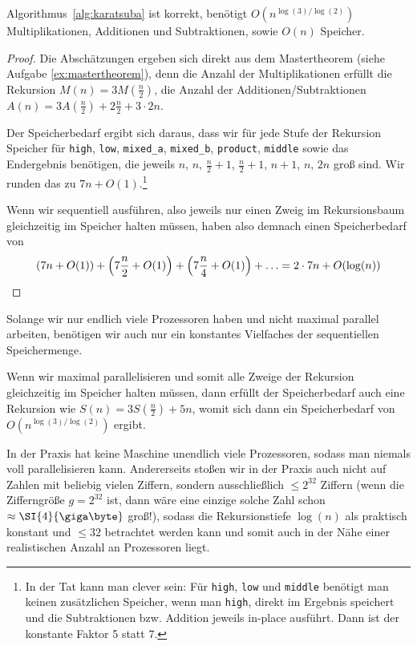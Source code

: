 \begin{proposition}
    Algorithmus~\ref{alg:karatsuba} ist korrekt, benötigt $O(n^{\log(3) / \log(2)})$ Multiplikationen, Additionen und Subtraktionen, sowie $O(n)$ Speicher.
\end{proposition}
\begin{proof}
    Die Abschätzungen ergeben sich direkt aus dem Mastertheorem (siehe Aufgabe \ref{ex:mastertheorem}), denn die Anzahl der Multiplikationen erfüllt die Rekursion $M(n) = 3 M(\frac{n}{2})$, die Anzahl der Additionen/Subtraktionen $A(n) = 3 A(\frac{n}{2})+2\frac{n}{2} + 3\cdot 2n$.

    \medskip
    Der Speicherbedarf ergibt sich daraus, dass wir für jede Stufe der Rekursion Speicher für \texttt{high}, \texttt{low}, \texttt{mixed\_a}, \texttt{mixed\_b}, \texttt{product},  \texttt{middle} sowie das Endergebnis benötigen, die jeweils $n$, $n$, $\frac{n}{2}+1$, $\frac{n}{2}+1$, $n+1$, $n$, $2n$ groß sind. Wir runden das zu $7n+O(1)$.\footnote{In der Tat kann man clever sein: Für \texttt{high}, \texttt{low} und \texttt{middle} benötigt man keinen zusätzlichen Speicher, wenn man \texttt{high},  direkt im Ergebnis speichert und die Subtraktionen bzw. Addition jeweils in-place ausführt. Dann ist der konstante Faktor 5 statt 7.}

    \smallskip
    Wenn wir sequentiell ausführen, also jeweils nur einen Zweig im Rekursionsbaum gleichzeitig im Speicher halten müssen, haben also demnach einen Speicherbedarf von
    \[\left(7n + O(1)\right) + \left(7\frac{n}{2} + O(1)\right) + \left(7 \frac{n}{4} + O(1)\right) + \ldots = 2\cdot 7n+O(\log(n)) \qedhere\]
\end{proof}

\begin{remark}
    Solange wir nur endlich viele Prozessoren haben und nicht maximal parallel arbeiten, benötigen wir auch nur ein konstantes Vielfaches der sequentiellen Speichermenge.

    Wenn wir maximal parallelisieren und somit alle Zweige der Rekursion gleichzeitig im Speicher halten müssen, dann erfüllt der Speicherbedarf auch eine Rekursion wie $S(n) = 3S(\frac{n}{2})+5n$, womit sich dann ein Speicherbedarf von $O(n^{\log(3)/\log(2)})$ ergibt.

    In der Praxis hat keine Maschine unendlich viele Prozessoren, sodass man niemals voll parallelisieren kann. Andererseits stoßen wir in der Praxis auch nicht auf Zahlen mit beliebig vielen Ziffern, sondern ausschließlich $\leq 2^{32}$ Ziffern (wenn die Zifferngröße $g=2^{32}$ ist, dann wäre eine einzige solche Zahl schon $\approx \SI{4}{\giga\byte}$ groß!), sodass die Rekursionstiefe $\log(n)$ als praktisch konstant und $\leq 32$ betrachtet werden kann und somit auch in der Nähe einer realistischen Anzahl an Prozessoren liegt.
\end{remark}